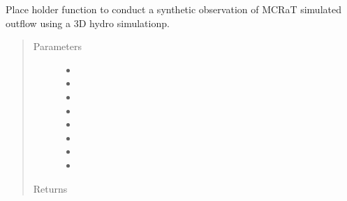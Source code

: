 \documentclass[letterpaper,10pt,english]{sphinxmanual}
\begin{document}
\begin{fulllineitems}
\label{\detokenize{mclib:mclib.event3D}}
Place holder function to conduct a synthetic observation of MCRaT simulated outflow using a 3D hydro simulationp.
\begin{quote}\begin{description}
\item[{Parameters}] \leavevmode\begin{itemize}
\item {} 
 \textendash{} 

\item {} 
 \textendash{} 

\item {} 
 \textendash{} 

\item {} 
 \textendash{} 

\item {} 
 \textendash{} 

\item {} 
 \textendash{} 

\item {} 
 \textendash{} 

\item {} 
 \textendash{} 

\end{itemize}

\item[{Returns}] \leavevmode


\end{description}\end{quote}

\end{fulllineitems}

\end{document}
